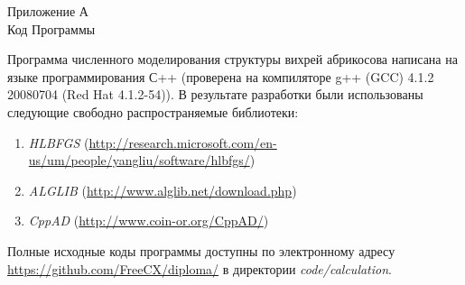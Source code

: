 \label{ch:A}
\begin{center}
    Приложение А\\
    Код Программы
\end{center}

Программа численного моделирования структуры вихрей абрикосова написана на 
языке программирования С++ (проверена на компиляторе g++ (GCC) 4.1.2 20080704 
(Red Hat 4.1.2-54)). В результате разработки были использованы следующие 
свободно распространяемые библиотеки:
\begin{enumerate}
    \item \emph{HLBFGS}
(\url{http://research.microsoft.com/en-us/um/people/yangliu/software/hlbfgs/})
    \item \emph{ALGLIB} (\url{http://www.alglib.net/download.php})
    \item \emph{CppAD} (\url{http://www.coin-or.org/CppAD/})
\end{enumerate}

Полные исходные коды программы доступны по электронному адресу 
\url{https://github.com/FreeCX/diploma/} в директории \emph{code/calculation}.

\newpage

